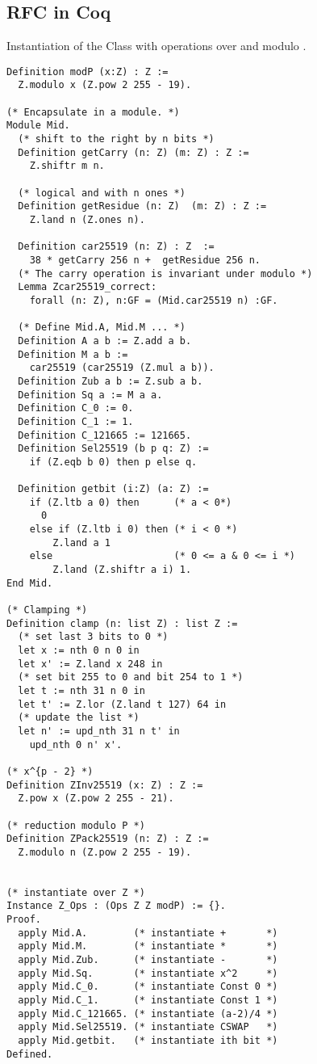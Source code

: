 \subsection{RFC in Coq}
\label{subsubsec:RFC-Coq}
Instantiation of the Class  with operations over \Z and modulo \p.
\begin{lstlisting}[language=Coq]
Definition modP (x:Z) : Z :=
  Z.modulo x (Z.pow 2 255 - 19).

(* Encapsulate in a module. *)
Module Mid.
  (* shift to the right by n bits *)
  Definition getCarry (n: Z) (m: Z) : Z :=
    Z.shiftr m n.

  (* logical and with n ones *)
  Definition getResidue (n: Z)  (m: Z) : Z :=
    Z.land n (Z.ones n).

  Definition car25519 (n: Z) : Z  :=
    38 * getCarry 256 n +  getResidue 256 n.
  (* The carry operation is invariant under modulo *)
  Lemma Zcar25519_correct:
    forall (n: Z), n:GF = (Mid.car25519 n) :GF.

  (* Define Mid.A, Mid.M ... *)
  Definition A a b := Z.add a b.
  Definition M a b :=
    car25519 (car25519 (Z.mul a b)).
  Definition Zub a b := Z.sub a b.
  Definition Sq a := M a a.
  Definition C_0 := 0.
  Definition C_1 := 1.
  Definition C_121665 := 121665.
  Definition Sel25519 (b p q: Z) :=
    if (Z.eqb b 0) then p else q.

  Definition getbit (i:Z) (a: Z) :=
    if (Z.ltb a 0) then      (* a < 0*)
      0
    else if (Z.ltb i 0) then (* i < 0 *)
        Z.land a 1
    else                     (* 0 <= a & 0 <= i *)
        Z.land (Z.shiftr a i) 1.
End Mid.

(* Clamping *)
Definition clamp (n: list Z) : list Z :=
  (* set last 3 bits to 0 *)
  let x := nth 0 n 0 in
  let x' := Z.land x 248 in
  (* set bit 255 to 0 and bit 254 to 1 *)
  let t := nth 31 n 0 in
  let t' := Z.lor (Z.land t 127) 64 in
  (* update the list *)
  let n' := upd_nth 31 n t' in
    upd_nth 0 n' x'.

(* x^{p - 2} *)
Definition ZInv25519 (x: Z) : Z :=
  Z.pow x (Z.pow 2 255 - 21).

(* reduction modulo P *)
Definition ZPack25519 (n: Z) : Z :=
  Z.modulo n (Z.pow 2 255 - 19).


(* instantiate over Z *)
Instance Z_Ops : (Ops Z Z modP) := {}.
Proof.
  apply Mid.A.        (* instantiate +       *)
  apply Mid.M.        (* instantiate *       *)
  apply Mid.Zub.      (* instantiate -       *)
  apply Mid.Sq.       (* instantiate x^2     *)
  apply Mid.C_0.      (* instantiate Const 0 *)
  apply Mid.C_1.      (* instantiate Const 1 *)
  apply Mid.C_121665. (* instantiate (a-2)/4 *)
  apply Mid.Sel25519. (* instantiate CSWAP   *)
  apply Mid.getbit.   (* instantiate ith bit *)
Defined.


\end{lstlisting}
